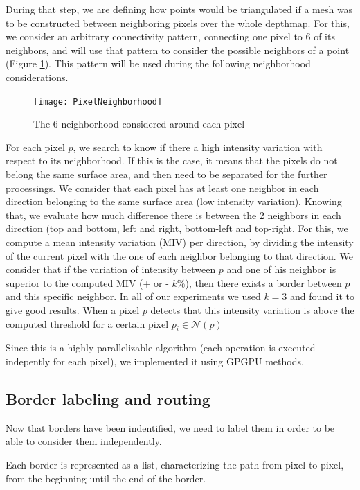 \documentclass[11pt,fleqn]{book} %
\begin{document}
During that step, we are defining how points would be triangulated if a mesh was to be constructed between neighboring pixels over the whole depthmap. 
For this, we consider an arbitrary connectivity pattern, connecting one pixel to 6 of its neighbors, and will use that pattern to consider the possible neighbors of a point (Figure \ref{fig:pixel_neighborhood}). 
This pattern will be used during the following neighborhood considerations.

\begin{figure}[ht]
\centering\texttt{[image: PixelNeighborhood]}
\caption{The 6-neighborhood considered around each pixel}
\label{fig:pixel_neighborhood}
\end{figure}

For each pixel $p$, we search to know if there a high intensity variation with respect to its neighborhood. If this is the case, it means that the pixels do not belong the same surface area, and then need to be separated for the further processings.
We consider that each pixel has at least one neighbor in each direction belonging to the same surface area (low intensity variation). Knowing that, we evaluate how much difference there is between the 2 neighbors in each direction (top and bottom, left and right, bottom-left and top-right.
For this, we compute a mean intensity variation (MIV) per direction, by dividing the intensity of the current pixel with the one of each neighbor belonging to that direction. We consider that if the variation of intensity between $p$ and one of his neighbor is superior to the computed MIV (+ or - $k$\%), then there exists a border between $p$ and this specific neighbor. In all of our experiments we used $k = 3$ and found it to give good results.
When a pixel $p$ detects that this intensity variation is above the computed threshold for a certain pixel $p_i \in \mathcal{N}(p)$

Since this is a highly parallelizable algorithm (each operation is executed indepently for each pixel), we implemented it using GPGPU methods.

\subsection{Border labeling and routing}
Now that borders have been indentified, we need to label them in order to be able to consider them independently. 

Each border is represented as a list, characterizing the path from pixel to pixel, from the beginning until the end of the border.
\end{document}
